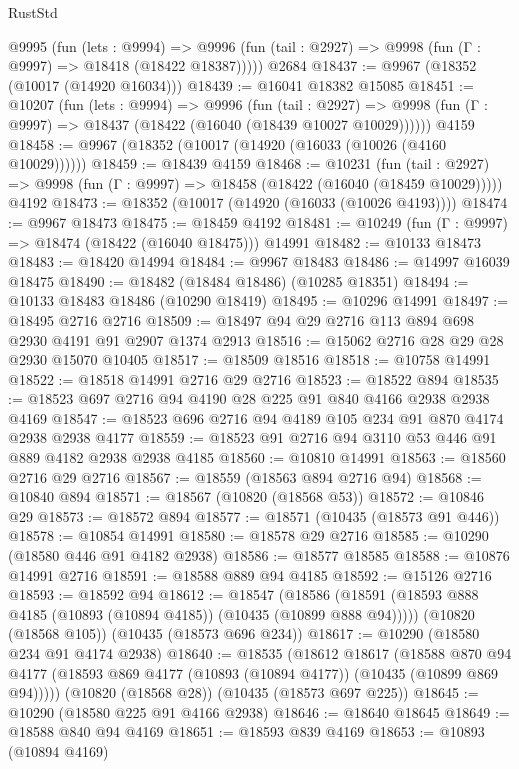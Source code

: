 \begin{lexlean}{RustStd}
\begin{coremodule}
{\begin{coremodule}
{{{{{{{{{{{{{{{{{{{{{{{{{{{{{{{{{{{{{{{{{{{{{{{{{{{{{{{{{{{{{{{{{{{{{{{{{{{{{{    @9995
      (fun (lets : @9994) =>
      @9996 (fun (tail : @2927) => @9998 (fun (Γ : @9997) => @18418 (@18422 @18387)))))
    @2684
@18437 := @9967 (@18352 (@10017 (@14920 @16034)))
@18439 := @16041 @18382 @15085
@18451 := @10207
    (fun (lets : @9994) =>
    @9996
      (fun (tail : @2927) =>
      @9998 (fun (Γ : @9997) => @18437 (@18422 (@16040 (@18439 @10027 @10029))))))
    @4159
@18458 := @9967 (@18352 (@10017 (@14920 (@16033 (@10026 (@4160 @10029))))))
@18459 := @18439 @4159
@18468 := @10231
    (fun (tail : @2927) => @9998 (fun (Γ : @9997) => @18458 (@18422 (@16040 (@18459 @10029)))))
    @4192
@18473 := @18352 (@10017 (@14920 (@16033 (@10026 @4193))))
@18474 := @9967 @18473
@18475 := @18459 @4192
@18481 := @10249 (fun (Γ : @9997) => @18474 (@18422 (@16040 @18475))) @14991
@18482 := @10133 @18473
@18483 := @18420 @14994
@18484 := @9967 @18483
@18486 := @14997 @16039 @18475
@18490 := @18482 (@18484 @18486) (@10285 @18351)
@18494 := @10133 @18483 @18486 (@10290 @18419)
@18495 := @10296 @14991
@18497 := @18495 @2716 @2716
@18509 := @18497 @94 @29 @2716 @113 @894 @698 @2930 @4191 @91 @2907 @1374 @2913
@18516 := @15062 @2716 @28 @29 @28 @2930 @15070 @10405
@18517 := @18509 @18516
@18518 := @10758 @14991
@18522 := @18518 @14991 @2716 @29 @2716
@18523 := @18522 @894
@18535 := @18523 @697 @2716 @94 @4190 @28 @225 @91 @840 @4166 @2938 @2938 @4169
@18547 := @18523 @696 @2716 @94 @4189 @105 @234 @91 @870 @4174 @2938 @2938 @4177
@18559 := @18523 @91 @2716 @94 @3110 @53 @446 @91 @889 @4182 @2938 @2938 @4185
@18560 := @10810 @14991
@18563 := @18560 @2716 @29 @2716
@18567 := @18559 (@18563 @894 @2716 @94)
@18568 := @10840 @894
@18571 := @18567 (@10820 (@18568 @53))
@18572 := @10846 @29
@18573 := @18572 @894
@18577 := @18571 (@10435 (@18573 @91 @446))
@18578 := @10854 @14991
@18580 := @18578 @29 @2716
@18585 := @10290 (@18580 @446 @91 @4182 @2938)
@18586 := @18577 @18585
@18588 := @10876 @14991 @2716
@18591 := @18588 @889 @94 @4185
@18592 := @15126 @2716
@18593 := @18592 @94
@18612 := @18547
    (@18586 (@18591 (@18593 @888 @4185 (@10893 (@10894 @4185)) (@10435 (@10899 @888 @94)))))
    (@10820 (@18568 @105))
    (@10435 (@18573 @696 @234))
@18617 := @10290 (@18580 @234 @91 @4174 @2938)
@18640 := @18535
    (@18612
      @18617
      (@18588
        @870
        @94
        @4177
        (@18593 @869 @4177 (@10893 (@10894 @4177)) (@10435 (@10899 @869 @94)))))
    (@10820 (@18568 @28))
    (@10435 (@18573 @697 @225))
@18645 := @10290 (@18580 @225 @91 @4166 @2938)
@18646 := @18640 @18645
@18649 := @18588 @840 @94 @4169
@18651 := @18593 @839 @4169
@18653 := @10893 (@10894 @4169)
}}}}}}}}}}}}}}}}}}}}}}}}}}}}}}}}}}}}}}}}}}}}}}}}}}}}}}}}}}}}}}}}}}}}}}}}}}}}}}
\end{coremodule}}
\end{coremodule}
\end{lexlean}
